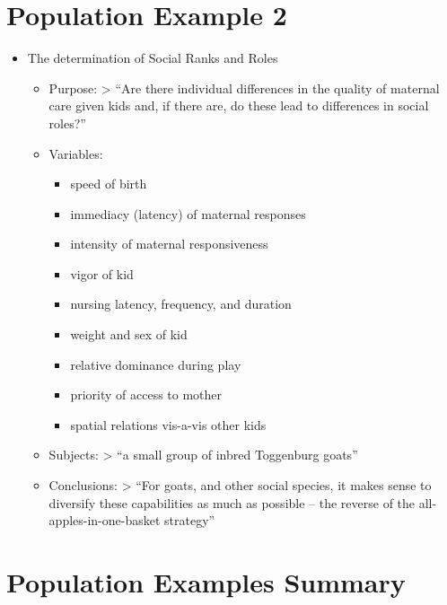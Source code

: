 \documentclass[12pt]{article}
\begin{document}
\section{Population Example 2}\label{population-example-2}

\begin{itemize}
\itemsep1pt\parskip0pt
\item
  The determination of Social Ranks and Roles

  \begin{itemize}
  \item
    Purpose: \textgreater{} ``Are there individual differences in the
    quality of maternal care given kids and, if there are, do these lead
    to differences in social roles?''
  \item
    Variables:

    \begin{itemize}
    \itemsep1pt\parskip0pt
    \item
      speed of birth
    \item
      immediacy (latency) of maternal responses
    \item
      intensity of maternal responsiveness
    \item
      vigor of kid
    \item
      nursing latency, frequency, and duration
    \item
      weight and sex of kid
    \item
      relative dominance during play
    \item
      priority of access to mother
    \item
      spatial relations vis-a-vis other kids
    \end{itemize}
  \item
    Subjects: \textgreater{} ``a small group of inbred Toggenburg
    goats''
  \item
    Conclusions: \textgreater{} ``For goats, and other social species,
    it makes sense to diversify these capabilities as much as possible
    -- the reverse of the all-apples-in-one-basket strategy''
  \end{itemize}
\end{itemize}

\section{Population Examples Summary}\label{population-examples-summary}
\end{document}
